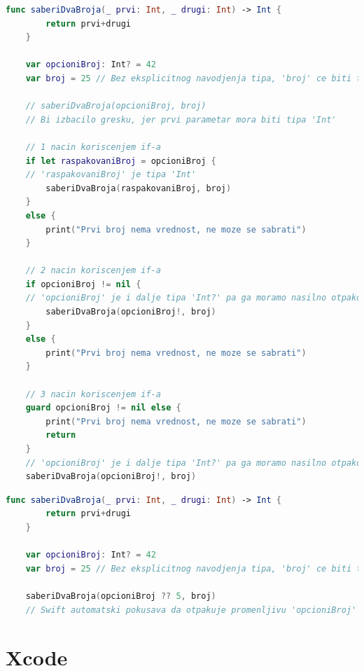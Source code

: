 \documentclass[12pt,oneside]{memoir}
\begin{document}
\begin{lstlisting}[caption=\textit{{Одмотавање опционе променљиве коришћењем услова}}, label={lst:Одмотавање опционе променљиве коришћењем услова}, language=Swift, frame=single]
    func saberiDvaBroja(_ prvi: Int, _ drugi: Int) -> Int {
        return prvi+drugi
    }
    
    var opcioniBroj: Int? = 42
    var broj = 25 // Bez eksplicitnog navodjenja tipa, 'broj' ce biti tipa 'Int'
    
    // saberiDvaBroja(opcioniBroj, broj)
    // Bi izbacilo gresku, jer prvi parametar mora biti tipa 'Int'
    
    // 1 nacin koriscenjem if-a
    if let raspakovaniBroj = opcioniBroj {
    // 'raspakovaniBroj' je tipa 'Int'
        saberiDvaBroja(raspakovaniBroj, broj)
    }
    else {
        print("Prvi broj nema vrednost, ne moze se sabrati")
    }
    
    // 2 nacin koriscenjem if-a
    if opcioniBroj != nil {
    // 'opcioniBroj' je i dalje tipa 'Int?' pa ga moramo nasilno otpakovati
        saberiDvaBroja(opcioniBroj!, broj)
    }
    else {
        print("Prvi broj nema vrednost, ne moze se sabrati")
    }
    
    // 3 nacin koriscenjem if-a
    guard opcioniBroj != nil else {
        print("Prvi broj nema vrednost, ne moze se sabrati")
        return
    }
    // 'opcioniBroj' je i dalje tipa 'Int?' pa ga moramo nasilno otpakovati
    saberiDvaBroja(opcioniBroj!, broj)
\end{lstlisting}

\begin{lstlisting}[caption=\textit{{Одмотавање опционе променљиве задавањем подразумеване вредности}}, label={lst:Одмотавање опционе променљиве задавањем подразумеване вредности}, language=Swift, frame=single]
    func saberiDvaBroja(_ prvi: Int, _ drugi: Int) -> Int {
        return prvi+drugi
    }
    
    var opcioniBroj: Int? = 42
    var broj = 25 // Bez eksplicitnog navodjenja tipa, 'broj' ce biti tipa 'Int'
    
    saberiDvaBroja(opcioniBroj ?? 5, broj)
    // Swift automatski pokusava da otpakuje promenljivu 'opcioniBroj' i ukoliko nema vrednost, odnosno njena vrednost je 'nil', uzece podrazumevanu vrednost, u ovom slucaju broj 5
\end{lstlisting}

\section{Xcode}
\label{sec:Xcode}
\end{document}
